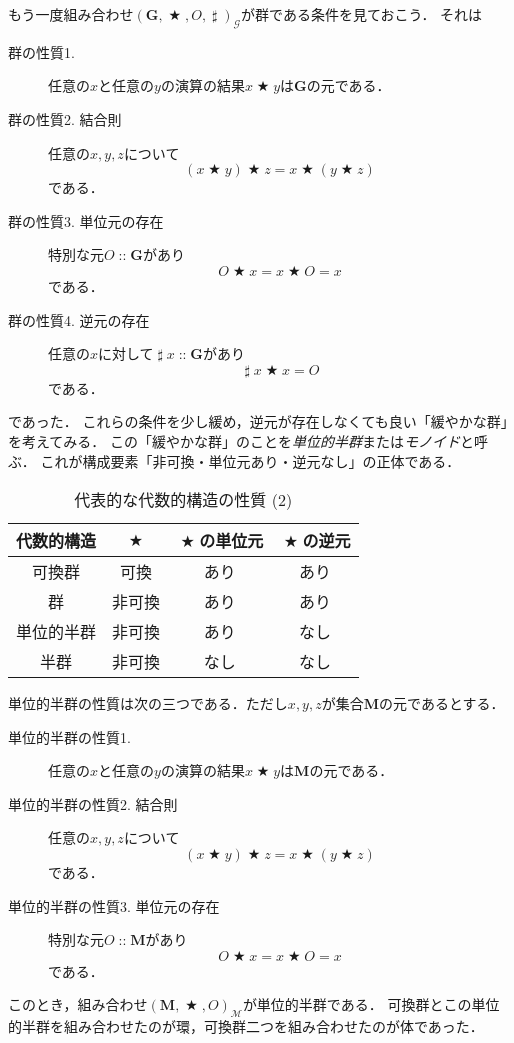 \documentclass[twocolumn]{jsbook}
\newcommand{\keyword}[1]{\emph{#1}}
\DeclareMathOperator{\mathAnyBinaryOperator}{\bigstar}
\DeclareMathOperator{\mathInverse}{\sharp}
\DeclareMathOperator{\mathIn}{::}
\newcommand{\mathSet}[1]{\mathbf{#1}}
\newcommand{\mathMonoid}[3]{(#1,#2,#3)_\mathcal{M}}
\newcommand{\mathGroup}[4]{(#1,#2,#3,#4)_\mathcal{G}}
\begin{document}
もう一度組み合わせ$\mathGroup{\mathSet{G}}{\mathAnyBinaryOperator}{O}{\mathInverse}$が群である条件を見ておこう．
それは
\begin{description}
\item[群の性質1.] 任意の$x$と任意の$y$の演算の結果$x\mathAnyBinaryOperator y$は$\mathSet{G}$の元である．
\item[群の性質2. 結合則] 任意の$x,y,z$について$$(x\mathAnyBinaryOperator y)\mathAnyBinaryOperator z=x\mathAnyBinaryOperator(y\mathAnyBinaryOperator z)$$である．
\item[群の性質3. 単位元の存在] 特別な元$O\mathIn\mathSet{G}$があり$$O\mathAnyBinaryOperator x=x\mathAnyBinaryOperator O=x$$である．
\item[群の性質4. 逆元の存在] 任意の$x$に対して$\mathInverse x\mathIn\mathSet{G}$があり$$\mathInverse x\mathAnyBinaryOperator x=O$$である．
\end{description}
であった．
これらの条件を少し緩め，逆元が存在しなくても良い「緩やかな群」を考えてみる．
この「緩やかな群」のことを\keyword{単位的半群}または\keyword{モノイド}と呼ぶ．
これが構成要素「非可換・単位元あり・逆元なし」の正体である．

\begin{table}
\caption{代表的な代数的構造の性質 (2)}
\label{tab:group-and-monoid}
\begin{center}
\begin{tabular}{||c||c|c|c||}
\hline
代数的構造&$\mathAnyBinaryOperator$&$\mathAnyBinaryOperator$の単位元&$\mathAnyBinaryOperator$の逆元\\
\hline\hline
可換群&可換&あり&あり\\
群&非可換&あり&あり\\
単位的半群&非可換&あり&なし\\
半群&非可換&なし&なし\\
\hline
\end{tabular}
\end{center}
\end{table}

単位的半群の性質は次の三つである．ただし$x,y,z$が集合$\mathSet{M}$の元であるとする．
\begin{description}
\item[単位的半群の性質1.] 任意の$x$と任意の$y$の演算の結果$x\mathAnyBinaryOperator y$は$\mathSet{M}$の元である．
\item[単位的半群の性質2. 結合則] 任意の$x,y,z$について$$(x\mathAnyBinaryOperator y)\mathAnyBinaryOperator z=x\mathAnyBinaryOperator(y\mathAnyBinaryOperator z)$$である．
\item[単位的半群の性質3. 単位元の存在] 特別な元$O\mathIn\mathSet{M}$があり$$O\mathAnyBinaryOperator x=x\mathAnyBinaryOperator O=x$$である．
\end{description}
このとき，組み合わせ$\mathMonoid{\mathSet{M}}{\mathAnyBinaryOperator}{O}$が単位的半群である．
可換群とこの単位的半群を組み合わせたのが環，可換群二つを組み合わせたのが体であった．
\end{document}
